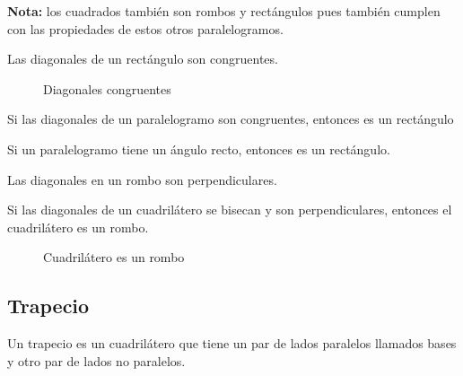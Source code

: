 \textbf{Nota:} los cuadrados también son rombos y rectángulos pues también cumplen con las propiedades de estos otros paralelogramos.

\clearpage

\begin{theorem}
    Las diagonales de un rectángulo son congruentes.

    \begin{figure}[!h]
        \centering
        
        \caption{Diagonales congruentes}
        \label{fig:theorem14}
    \end{figure}
    
\end{theorem}

\begin{theorem}
    Si las diagonales de un paralelogramo son congruentes, entonces es un rectángulo
\end{theorem}

\begin{theorem}
    Si un paralelogramo tiene un ángulo recto, entonces es un rectángulo.
\end{theorem}

\begin{theorem}
    Las diagonales en un rombo son perpendiculares.
\end{theorem}

\begin{theorem}
    Si las diagonales de un cuadrilátero se bisecan y son perpendiculares, entonces el cuadrilátero es un rombo.

    \begin{figure}[!h]
        \centering
        
        \caption{Cuadrilátero es un rombo}
        \label{fig:theorem15}
    \end{figure}
    
\end{theorem}

\clearpage

\subsection{Trapecio}

\begin{definition}
    Un trapecio es un cuadrilátero que tiene un par de lados paralelos llamados bases y otro par de lados no paralelos.
\end{definition}

